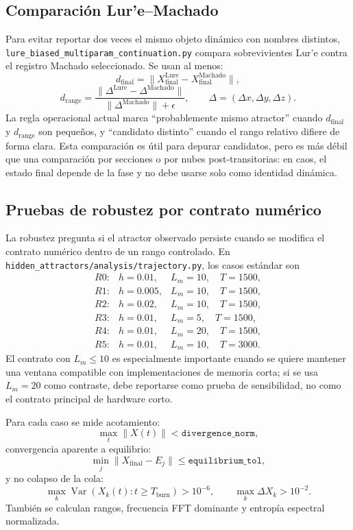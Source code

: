 \documentclass[11pt]{article}
\begin{document}
\subsection{Comparación Lur'e--Machado}

Para evitar reportar dos veces el mismo objeto dinámico con nombres
distintos, \texttt{lure\_biased\_multiparam\_continuation.py} compara
sobrevivientes Lur'e contra el registro Machado seleccionado. Se usan al
menos:
\[
d_{\mathrm{final}}=
\|X_{\mathrm{final}}^{\mathrm{Lure}}
-X_{\mathrm{final}}^{\mathrm{Machado}}\|,
\]
\[
d_{\mathrm{range}}=
\frac{\|\Delta^{\mathrm{Lure}}-\Delta^{\mathrm{Machado}}\|}
{\|\Delta^{\mathrm{Machado}}\|+\epsilon},
\qquad
\Delta=(\Delta x,\Delta y,\Delta z).
\]
La regla operacional actual marca ``probablemente mismo atractor'' cuando
\(d_{\mathrm{final}}\) y \(d_{\mathrm{range}}\) son pequeños, y
``candidato distinto'' cuando el rango relativo difiere de forma clara. Esta
comparación es útil para depurar candidatos, pero es más débil que una
comparación por secciones o por nubes post-transitorias: en caos, el estado
final depende de la fase y no debe usarse solo como identidad dinámica.

\subsection{Pruebas de robustez por contrato numérico}

La robustez pregunta si el atractor observado persiste cuando se modifica el
contrato numérico dentro de un rango controlado. En
\texttt{hidden\_attractors/analysis/trajectory.py}, los casos estándar son
\[
\begin{array}{lll}
R0: & h=0.01,  & L_m=10,\quad T=1500,\\
R1: & h=0.005, & L_m=10,\quad T=1500,\\
R2: & h=0.02,  & L_m=10,\quad T=1500,\\
R3: & h=0.01,  & L_m=5,\quad T=1500,\\
R4: & h=0.01,  & L_m=20,\quad T=1500,\\
R5: & h=0.01,  & L_m=10,\quad T=3000.
\end{array}
\]
El contrato con \(L_m\leq10\) es especialmente importante cuando se quiere
mantener una ventana compatible con implementaciones de memoria corta; si se
usa \(L_m=20\) como contraste, debe reportarse como prueba de sensibilidad, no
como el contrato principal de hardware corto.

Para cada caso se mide acotamiento:
\[
\max_t\|X(t)\|<\texttt{divergence\_norm},
\]
convergencia aparente a equilibrio:
\[
\min_j\|X_{\mathrm{final}}-E_j\|\leq
\texttt{equilibrium\_tol},
\]
y no colapso de la cola:
\[
\max_k\operatorname{Var}(X_k(t):t\geq T_{\mathrm{burn}})>10^{-6},
\qquad
\max_k\Delta X_k>10^{-2}.
\]
También se calculan rangos, frecuencia FFT dominante y entropía espectral
normalizada.
\end{document}
